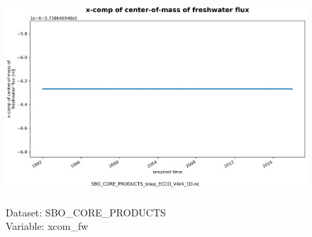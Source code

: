 \begin{figure}[H]
\centering
\includegraphics[scale=0.5]{../images/plots/oneD_plots/SBO_Core_Products/xcom_fw.png}
\caption{\\Dataset: SBO\_CORE\_PRODUCTS\\Variable: xcom\_fw}
\label{tab:table-SBO_CORE_PRODUCTS_xcom_fw-Plot}
\end{figure}
\pagebreak

